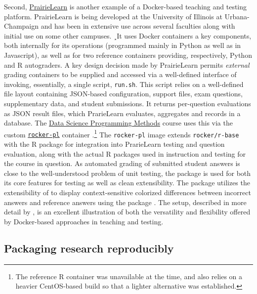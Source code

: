 Second, \href{https://github.com/PrairieLearn}{PrairieLearn} is another
example of a Docker-based teaching and testing platform. PrairieLearn is
being developed at the University of Illinois at Urbana-Champaign
\citep{prairielearn:2018} and has been in extensive use across several
faculties along with initial use on some other campuses. ¸It uses Docker
containers a key components, both internally for its operations
(programmed mainly in Python as well as in Javascript), as well as for
two reference containers providing, respectively, Python and R
autograders. A key design decision made by PrairieLearn permits
\emph{external} grading containers to be supplied and accessed via a
well-defined interface of invoking, essentially, a single script,
\texttt{run.sh}. This script relies on a well-defined file layout
containing JSON-based configuration, support files, exam questions,
supplementary data, and student submissions. It returns per-question
evaluations as JSON result files, which PrarieLearn evaluates,
aggregates and records in a database. The
\href{https://stat430.com}{Data Science Programming Methods} course
\citep{stat430:2019} uses this via the custom
\href{https://github.com/stat430dspm/rocker-pl}{\texttt{rocker-pl}}
container
\citep{rocker-pl:2019}.\footnote{The reference R container was unavailable at the time, and also relies on a heavier CentOS-based build so that a lighter alternative was established.}
The \texttt{rocker-pl} image extends \texttt{rocker/r-base} with the
 R package \citep{pkg:plr:2019} for integration into
PrarieLearn testing and question evaluation, along with the actual R
packages used in instruction and testing for the course in question. As
automated grading of submitted student answers is close to the
well-understood problem of unit testing, the  package
\citep{CRAN:tinytest} is used for both its core features for testing as
well as clean extensibility. The package 
\citep{CRAN:ttdo} utilizes the extensibility of  to
display context-sensitive colorized differences between incorrect
answers and reference answers using the  package
\citep{CRAN:diffobj}. The setup, described in more detail by
\citet{paper:r_autograder}, is an excellent illustration of both the
versatility and flexibility offered by Docker-based approaches in
teaching and testing.

\hypertarget{packaging-research-reproducibly}{%
\subsection{Packaging research
reproducibly}\label{packaging-research-reproducibly}}

